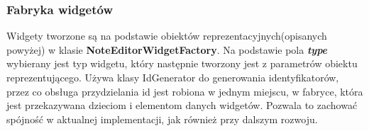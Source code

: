 \subsubsection{Fabryka widgetów}

Widgety tworzone są na podstawie obiektów reprezentacyjnych(opisanych powyżej) w klasie \textbf{NoteEditorWidgetFactory}. Na podstawie pola \textbf{\textit{type}} wybierany jest typ widgetu, który następnie tworzony jest z parametrów obiektu reprezentującego. Używa klasy IdGenerator do generowania identyfikatorów, przez co obsługa przydzielania id jest robiona w jednym miejscu, w fabryce, która jest przekazywana dzieciom i elementom danych widgetów. Pozwala to zachować spójność w aktualnej implementacji, jak również przy dalszym rozwoju.